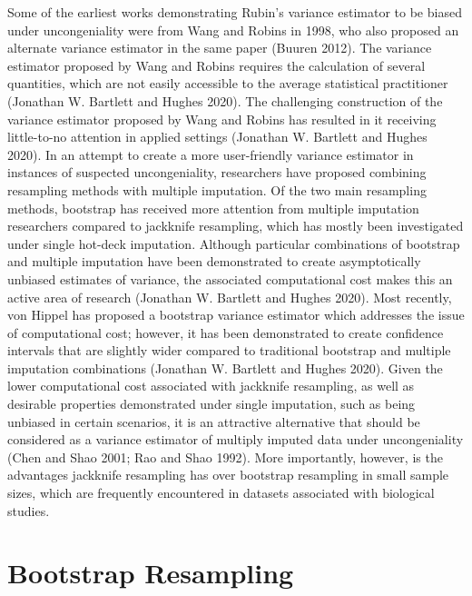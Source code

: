\documentclass[
  letterpaper,
  DIV=11,
  numbers=noendperiod]{scrreprt}
\begin{document}
Some of the earliest works demonstrating Rubin's variance estimator to
be biased under uncongeniality were from Wang and Robins in 1998, who
also proposed an alternate variance estimator in the same paper (Buuren
2012). The variance estimator proposed by Wang and Robins requires the
calculation of several quantities, which are not easily accessible to
the average statistical practitioner (Jonathan W. Bartlett and Hughes
2020). The challenging construction of the variance estimator proposed
by Wang and Robins has resulted in it receiving little-to-no attention
in applied settings (Jonathan W. Bartlett and Hughes 2020). In an
attempt to create a more user-friendly variance estimator in instances
of suspected uncongeniality, researchers have proposed combining
resampling methods with multiple imputation. Of the two main resampling
methods, bootstrap has received more attention from multiple imputation
researchers compared to jackknife resampling, which has mostly been
investigated under single hot-deck imputation. Although particular
combinations of bootstrap and multiple imputation have been demonstrated
to create asymptotically unbiased estimates of variance, the associated
computational cost makes this an active area of research (Jonathan W.
Bartlett and Hughes 2020). Most recently, von Hippel has proposed a
bootstrap variance estimator which addresses the issue of computational
cost; however, it has been demonstrated to create confidence intervals
that are slightly wider compared to traditional bootstrap and multiple
imputation combinations (Jonathan W. Bartlett and Hughes 2020). Given
the lower computational cost associated with jackknife resampling, as
well as desirable properties demonstrated under single imputation, such
as being unbiased in certain scenarios, it is an attractive alternative
that should be considered as a variance estimator of multiply imputed
data under uncongeniality (Chen and Shao 2001; Rao and Shao 1992). More
importantly, however, is the advantages jackknife resampling has over
bootstrap resampling in small sample sizes, which are frequently
encountered in datasets associated with biological studies.

\hypertarget{bootstrap-resampling}{%
\section{Bootstrap Resampling}\label{bootstrap-resampling}}
\end{document}
